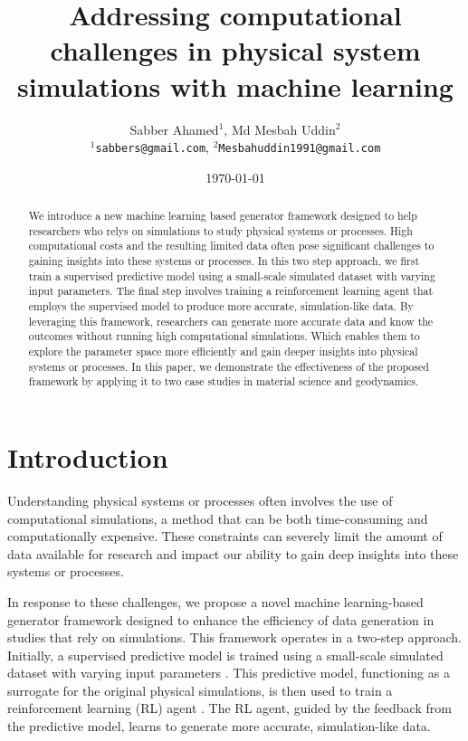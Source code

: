 \documentclass{article}
\title{Addressing computational challenges in physical system simulations with machine learning}
\author{
    Sabber Ahamed$^1$, Md Mesbah Uddin$^2$ \\
    \texttt{$^1$sabbers@gmail.com}, \texttt{$^2$Mesbahuddin1991@gmail.com} \\
}
\date{\today}
\begin{document}
\maketitle

\begin{abstract}
    \noindent We introduce a new machine learning based generator framework designed to help researchers who relys on simulations to study physical systems or processes. High computational costs and the resulting limited data often pose significant challenges to gaining insights into these systems or processes. In this two step approach, we first train a supervised predictive model using a small-scale simulated dataset with varying input parameters. The final step involves training a reinforcement learning agent that employs the supervised model to produce more accurate, simulation-like data. By leveraging this framework, researchers can generate more accurate data and know the outcomes without running high computational simulations. Which enables them to explore the parameter space more efficiently and gain deeper insights into physical systems or processes. In this paper, we demonstrate the effectiveness of the proposed framework by applying it to two case studies in material science and geodynamics.
\end{abstract}

\maketitle

\section{Introduction}

Understanding physical systems or processes often involves the use of computational simulations, a method that can be both time-consuming and computationally expensive. These constraints can severely limit the amount of data available for research and impact our ability to gain deep insights into these systems or processes.

In response to these challenges, we propose a novel machine learning-based generator framework designed to enhance the efficiency of data generation in studies that rely on simulations. This framework operates in a two-step approach. Initially, a supervised predictive model is trained using a small-scale simulated dataset with varying input parameters \cite{bishop2006pattern}. This predictive model, functioning as a surrogate for the original physical simulations, is then used to train a reinforcement learning (RL) agent \cite{sutton2018reinforcement}. The RL agent, guided by the feedback from the predictive model, learns to generate more accurate, simulation-like data.
\end{document}
